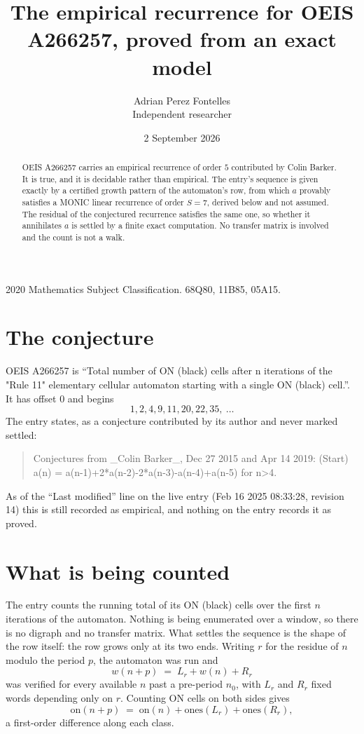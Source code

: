 \documentclass[11pt,a4paper]{article}
\title{The empirical recurrence for OEIS A266257, proved from an exact model}
\author{Adrian Perez Fontelles\\ \small Independent researcher}
\date{2 September 2026}
\theoremstyle{plain}
\theoremstyle{definition}
\begin{document}
\maketitle

\begin{abstract}
OEIS A266257 carries an empirical recurrence of order $5$ contributed by Colin Barker. It is true, and it is
decidable rather than empirical. The entry's sequence is given exactly by a certified growth pattern of the automaton's row, from
which $a$ provably satisfies a MONIC linear recurrence of order $S=7$, derived below and not
assumed. The residual of the conjectured recurrence satisfies the same one, so whether it
annihilates $a$ is settled by a finite exact computation. No transfer matrix is involved and
the count is not a walk.
\end{abstract}

\noindent\small 2020 Mathematics Subject Classification. 68Q80, 11B85, 05A15.\normalsize

\section{The conjecture}

OEIS A266257 is ``Total number of ON (black) cells after n iterations of the "Rule 11" elementary cellular automaton starting with a single ON (black) cell.''. It has offset $0$ and begins
\[
1, 2, 4, 9, 11, 20, 22, 35,\ \dots
\]
The entry states, as a conjecture contributed by its author and never marked settled:
\begin{quote}
Conjectures from \_Colin Barker\_, Dec 27 2015 and Apr 14 2019: (Start) a(n) = a(n-1)+2*a(n-2)-2*a(n-3)-a(n-4)+a(n-5) for n>4.
\end{quote}
As of the ``Last modified'' line on the live entry (Feb 16 2025 08:33:28, revision 14)
this is still recorded as empirical, and nothing on the entry records it as proved.

\section{What is being counted}

The entry counts the running total of its ON (black) cells over the first $n$ iterations of the automaton. Nothing is being enumerated over a window, so there is
no digraph and no transfer matrix. What settles the sequence is the shape of the row itself:
the row grows only at its two ends. Writing
$r$ for the residue of $n$ modulo the period $p$, the automaton was run and
\[
w(n+p)\;=\;L_r + w(n) + R_r
\]
was verified for every available $n$ past a
pre-period $n_0$, with $L_r$ and $R_r$ fixed words depending only on $r$. Counting ON cells on
both sides gives
\[
\mathrm{on}(n+p)\;=\;\mathrm{on}(n)+\mathrm{ones}(L_r)+\mathrm{ones}(R_r),
\]
a first-order difference along each class.
\end{document}
